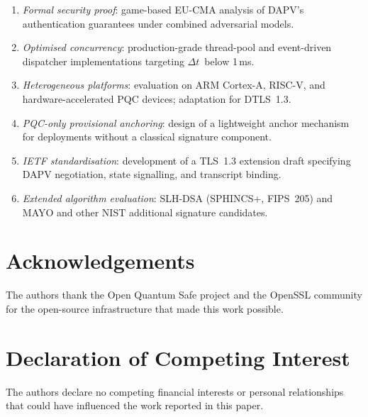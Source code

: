 \documentclass[preprint,10pt,3p]{elsarticle}
\newcommand{\Dt}{\ensuremath{\Delta t}}
\newcommand{\ms}{\,ms}
\begin{document}
\begin{enumerate}[noitemsep]
\item \textit{Formal security proof}: game-based EU-CMA analysis of DAPV's
  authentication guarantees under combined adversarial models.
\item \textit{Optimised concurrency}: production-grade thread-pool and
  event-driven dispatcher implementations targeting \Dt\ below 1\ms.
\item \textit{Heterogeneous platforms}: evaluation on ARM Cortex-A, RISC-V,
  and hardware-accelerated PQC devices; adaptation for DTLS~1.3.
\item \textit{PQC-only provisional anchoring}: design of a lightweight anchor
  mechanism for deployments without a classical signature component.
\item \textit{IETF standardisation}: development of a TLS~1.3 extension draft
  specifying DAPV negotiation, state signalling, and transcript binding.
\item \textit{Extended algorithm evaluation}: SLH-DSA (SPHINCS+, FIPS~205) and
  MAYO and other NIST additional signature candidates.
\end{enumerate}

\section*{Acknowledgements}

The authors thank the Open Quantum Safe project and the OpenSSL community for
the open-source infrastructure that made this work possible.

\section*{Declaration of Competing Interest}

The authors declare no competing financial interests or personal relationships
that could have influenced the work reported in this paper.



\end{document}
